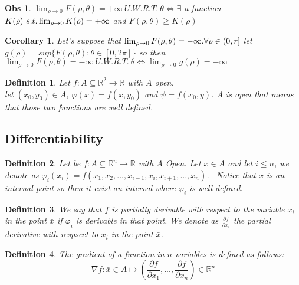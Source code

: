 \documentclass{article}
\newtheorem{definition}{Definition}
\newtheorem{corollary}{Corollary}
\newtheorem{observation}{Obs}
\begin{document}
    \begin{observation}
        $\lim_{\rho \to 0} F(\rho, \theta) = +\infty \ U.W.R.T. \ \theta \Longleftrightarrow \exists$ a function $K(\rho) \ s.t. \\ \lim_{\rho \to 0}K(\rho) = +\infty$ and $F(\rho,\theta) \geq K(\rho)$ 
    \end{observation}
    \begin{corollary}
        Let's suppose that $\lim_{\rho \to 0} F(\rho, \theta) = -\infty. \\ \forall \rho \in (0,r]$ let $g(\rho) = sup\{F(\rho, \theta) : \theta \in [0,2\pi] \}$ so then $\lim_{\rho \to 0} F(\rho, \theta) = -\infty \ U.W.R.T. \ \theta \Longleftrightarrow \lim_{\rho \to 0} g(\rho) = -\infty$
    \end{corollary}
    \begin{definition}
        Let $f : A \subseteq \mathbb{R}^2 \rightarrow \mathbb{R}$ with $A$ open.\\
        let $(x_0,y_0) \in A$, $\varphi(x) = f(x,y_0)$ and $\psi = f(x_0,y)$.
        $A$ is open that means that those two functions are well defined. 
    \end{definition}
    \subsection*{Differentiability}
    \begin{definition}
        Let be $f : A \subseteq \mathbb{R}^n \rightarrow \mathbb{R}$ with $A$ Open.
        Let $\bar{x} \in A$ and let $i \leq n$, we denote as $\varphi_i(x_i) = f(\bar{x}_1, \bar{x}_2, ... ,\bar{x}_{i-1},\bar{x}_i, \bar{x}_{i+1}, ... , \bar{x}_n)$. \
        Notice that $\bar{x}$ is an internal point so then it exist an interval where $\varphi_i$ is well defined. 
    \end{definition}
    \begin{definition}
        We say that $f$ is partially derivable with respect to the variable $x_i$ in the point $\bar{x}$ if $\varphi_i$ is derivable in that point.
        We denote as $\frac{\partial f}{\partial x_i}$ the partial derivative with respsect to $x_i$ in the point $\bar{x}$. 
    \end{definition}
    \begin{definition}
        The gradient of a function in $n$ variables is defined as follows:
        \begin{equation*}
            \nabla f : \bar{x} \in A \longmapsto  \left( \frac{\partial f}{\partial x_1},..., \frac{\partial f}{\partial x_n} \right)  \in \mathbb{R}^n
        \end{equation*}
    \end{definition}
\end{document}
